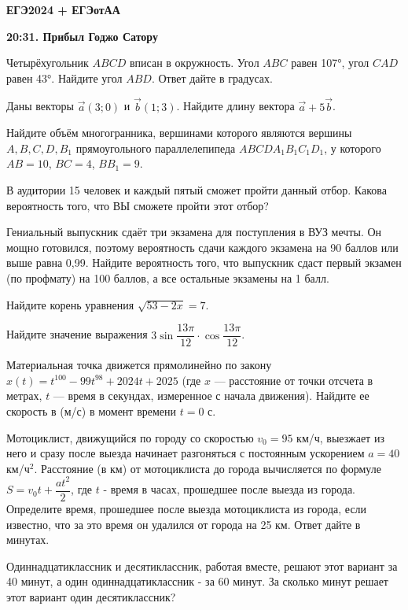 \centerline{\bf \Huge ЕГЭ2024 + ЕГЭотАА}
\centerline{\bf \Huge }

\begin{flushright}
        \scriptsize{\textbf{20:31. Прибыл Годжо Сатору}}
\end{flushright}

 Четырёхугольник $ABCD$ вписан в окружность. Угол $ABC$ равен 107°, угол $CAD$ равен 43°. Найдите угол $ABD$. Ответ дайте в градусах.

 Даны векторы $\vec{a}(3;0)$ и $\vec{b}(1;3)$. Найдите длину вектора $\vec{a} + 5\vec{b}$.

 Найдите объём многогранника, вершинами которого являются вершины $A, B, C, D, B_1$ прямоугольного параллелепипеда $ABCDA_1B_1C_1D_1$, у которого $AB=10$, $BC=4$, $BB_1=9$.

 В аудитории 15 человек и каждый пятый сможет пройти данный отбор. Какова вероятность того, что ВЫ сможете пройти этот отбор?

 Гениальный выпускник сдаёт три экзамена для поступления в ВУЗ мечты. Он мощно готовился, поэтому вероятность сдачи каждого экзамена на 90 баллов или выше равна 0,99. Найдите вероятность того, что выпускник сдаст первый экзамен (по профмату) на 100 баллов, а все остальные экзамены на 1 балл.

 Найдите корень уравнения $\sqrt{53-2x} = 7$.

 Найдите значение выражения $3\sin\dfrac{13\pi}{12}\cdot \cos\dfrac{13\pi}{12}$.

 Материальная точка движется прямолинейно по закону $x(t) = t^{100} - 99t^{98} + 2024t + 2025$ (где $x$ — расстояние от точки отсчета в метрах, $t$ — время в секундах, измеренное с начала движения). Найдите ее скорость в (м/с) в момент времени $t = 0$ с.

 Мотоциклист, движущийся по городу со скоростью $v_0=95$ км/ч, выезжает из него и сразу после выезда начинает разгоняться с постоянным ускорением $a=40$ км/ч$^2$. Расстояние (в км) от мотоциклиста до города вычисляется по формуле $S=v_0t + \dfrac{at^2}{2}$, где $t$ - время в часах, прошедшее после выезда из города. Определите время, прошедшее после выезда мотоциклиста из города, если известно, что за это время он удалился от города на 25 км. Ответ дайте в минутах.

 Одиннадцатиклассник и десятиклассник, работая вместе, решают этот вариант за 40 минут, а один одиннадцатиклассник - за 60 минут. За сколько минут решает этот вариант один десятиклассник?


